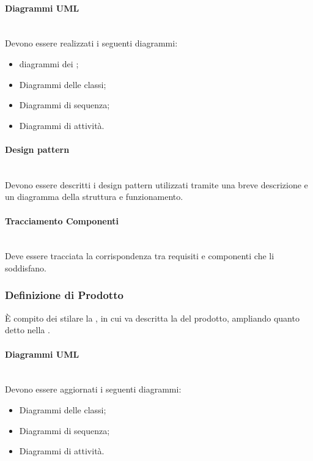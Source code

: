 \paragraph{Diagrammi UML}\mbox{}\\
Devono essere realizzati i seguenti diagrammi:
\begin{itemize}
\item diagrammi dei ;
\item Diagrammi delle classi;
\item Diagrammi di sequenza;
\item Diagrammi di attività.
\end{itemize}

\paragraph{Design pattern}\mbox{}\\
Devono essere descritti i design pattern utilizzati tramite una breve descrizione e un diagramma della struttura e funzionamento.

\paragraph{Tracciamento Componenti}\mbox{}\\
Deve essere tracciata la corrispondenza tra requisiti e componenti che li soddisfano.

\subsubsection{Definizione di Prodotto}
È compito dei \Progettisti{} stilare la \DefinizioneDiProdotto, in cui va descritta la \PD{} del prodotto, ampliando quanto detto nella \SpecificaTecnica.

\paragraph{Diagrammi UML}\mbox{}\\
Devono essere aggiornati i seguenti diagrammi:
\begin{itemize}
\item Diagrammi delle classi;
\item Diagrammi di sequenza;
\item Diagrammi di attività.
\end{itemize}

